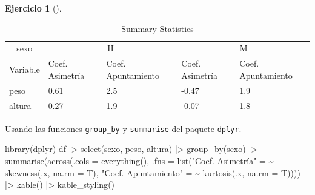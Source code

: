 \documentclass[
  a4paper,
]{scrreport}
\newenvironment{Shaded}{\begin{snugshade}}{\end{snugshade}}
\newcommand{\AttributeTok}[1]{\textcolor[rgb]{0.40,0.45,0.13}{#1}}
\newcommand{\ErrorTok}[1]{\textcolor[rgb]{0.68,0.00,0.00}{#1}}
\newcommand{\FunctionTok}[1]{\textcolor[rgb]{0.28,0.35,0.67}{#1}}
\newcommand{\NormalTok}[1]{\textcolor[rgb]{0.00,0.23,0.31}{#1}}
\newcommand{\OtherTok}[1]{\textcolor[rgb]{0.00,0.23,0.31}{#1}}
\newcommand{\SpecialCharTok}[1]{\textcolor[rgb]{0.37,0.37,0.37}{#1}}
\newcommand{\StringTok}[1]{\textcolor[rgb]{0.13,0.47,0.30}{#1}}
\theoremstyle{definition}
\newtheorem{exercise}{Ejercicio}[chapter]
\theoremstyle{remark}
\begin{document}
\begin{exercise}[]
\begin{enumerate}
\begin{tcolorbox}
  \begin{table}

  \caption{\label{tab:unnamed-chunk-28}Summary Statistics}
  \centering
  \begin{tabular}[t]{lllll}
  \toprule
  \multicolumn{1}{c}{sexo} & \multicolumn{2}{c}{H} & \multicolumn{2}{c}{M} \\
  \cmidrule(l{3pt}r{3pt}){1-1} \cmidrule(l{3pt}r{3pt}){2-3} \cmidrule(l{3pt}r{3pt}){4-5}
  Variable & Coef. Asimetría & Coef. Apuntamiento & Coef. Asimetría & Coef. Apuntamiento\\
  \midrule
  peso & 0.61 & 2.5 & -0.47 & 1.9\\
  altura & 0.27 & 1.9 & -0.07 & 1.8\\
  \bottomrule
  \end{tabular}
  \end{table}

  \end{tcolorbox}

  \begin{tcolorbox}[enhanced jigsaw, toprule=.15mm, rightrule=.15mm, arc=.35mm, colback=white, colbacktitle=quarto-callout-tip-color!10!white, toptitle=1mm, left=2mm, colframe=quarto-callout-tip-color-frame, opacityback=0, breakable, opacitybacktitle=0.6, bottomtitle=1mm, titlerule=0mm, title=\textcolor{quarto-callout-tip-color}{\faLightbulb}\hspace{0.5em}{Solución 2}, bottomrule=.15mm, coltitle=black, leftrule=.75mm]

  Usando las funciones \texttt{group\_by} y \texttt{summarise} del
  paquete \href{}{\texttt{dplyr}}.

\begin{Shaded}
\begin{Highlighting}[]
\FunctionTok{library}\NormalTok{(dplyr)}
\NormalTok{df }\SpecialCharTok{|\textgreater{}} \FunctionTok{select}\NormalTok{(sexo, peso, altura) }\SpecialCharTok{|\textgreater{}}
\FunctionTok{group\_by}\NormalTok{(sexo) }\SpecialCharTok{|\textgreater{}}
\FunctionTok{summarise}\NormalTok{(}\FunctionTok{across}\NormalTok{(}\AttributeTok{.cols =} \FunctionTok{everything}\NormalTok{(), }\AttributeTok{.fns =} \FunctionTok{list}\NormalTok{(}\StringTok{"Coef. Asimetría"} \OtherTok{=} \ErrorTok{\textasciitilde{}} \FunctionTok{skewness}\NormalTok{(.x, }\AttributeTok{na.rm =}\NormalTok{ T), }\StringTok{"Coef. Apuntamiento"} \OtherTok{=} \ErrorTok{\textasciitilde{}} \FunctionTok{kurtosis}\NormalTok{(.x, }\AttributeTok{na.rm =}\NormalTok{ T)))) }\SpecialCharTok{|\textgreater{}}
\FunctionTok{kable}\NormalTok{() }\SpecialCharTok{|\textgreater{}}
\FunctionTok{kable\_styling}\NormalTok{()}
\end{Highlighting}
\end{Shaded}


\end{tcolorbox}
\end{enumerate}
\end{exercise}
\end{document}
